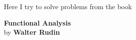 \newcommand{\hull}{\mathop{\rm hull}\nolimits}
\newcommand{\id}{\mathop{\rm id}\nolimits}
\newcommand{\Int}{\mathop{\rm Int}\nolimits}
\newcommand{\inter}[1]{\ensuremath{#1^{\circ}}}
\def\Lip{\mathop{\rm Lip}\nolimits}
\def\lip{\mathop{\rm lip}\nolimits}
\def\Ker{\mathop{\rm Ker}\nolimits}
\def\ker{\mathop{\rm ker}\nolimits}
\def\Re{\mathop{\rm Re}\nolimits}
\def\Im{\mathop{\rm Im}\nolimits}
\def\supp{\mathop{\rm supp}\nolimits}


\newenvironment{excopyOLD}
{\item\begin{minipage}[t]{.8\textwidth}\footnotesize}
{\smallskip\hrule\end{minipage}}

\newenvironment{excopy}
{\item %
 \begin{list}{}{
 \setlength{\topsep}{0pt}
 \setlength{\partopsep}{0pt}
 \setlength{\itemsep}{0pt}
 \setlength{\parsep}{0pt}
 \setlength{\leftmargin}{0pt}
 \setlength{\rightmargin}{20pt}
 \setlength{\listparindent}{0pt}
 \setlength{\itemindent}{0pt}
 \setlength{\labelwidth}{0pt}
 \footnotesize
 }
 \item
}
{\par
 {\nullfont a}\hrulefill
 \end{list}
}



\maketitle
\newpage
\tableofcontents
\newpage


\maketitle

\setcounter{chapter}{-1}

Here I try to solve problems
from the book \cite{RudinFA79}
\begin{center}
\textbf{Functional Analysis}\\
by
\textbf{Walter Rudin}
\end{center}

